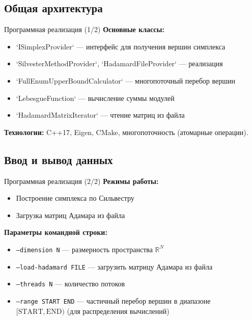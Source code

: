 \documentclass{beamer}
\begin{document}
\subsection{Общая архитектура} %
\begin{frame}{Программная реализация (1/2)}
    \textbf{Основные классы:}
    \begin{itemize}
        \item `ISimplexProvider` — интерфейс для получения вершин симплекса
        \item `SilvesterMethodProvider`, `HadamardFileProvider` — реализация
        \item `FullEnumUpperBoundCalculator` — многопоточный перебор вершин
        \item `LebesgueFunction` — вычисление суммы модулей
        \item `HadamardMatrixIterator` — чтение матриц из файла
    \end{itemize}
    \textbf{Технологии:} C++17, Eigen, CMake, многопоточность (атомарные операции).
\end{frame}

\subsection{Ввод и вывод данных}
\begin{frame}{Программная реализация (2/2)}
    \textbf{Режимы работы:}
    \begin{itemize}
        \item Построение симплекса по Сильвестру
        \item Загрузка матриц Адамара из файла
    \end{itemize}

    \textbf{Параметры командной строки:}
    \begin{itemize}
        \item \texttt{--dimension N} — размерность пространства $\mathbb{R}^N$
        \item \texttt{--load-hadamard FILE} — загрузить матрицу Адамара из файла
        \item \texttt{--threads N} — количество потоков
        \item \texttt{--range START END} — частичный перебор вершин в диапазоне $[\text{START}, \text{END})$ (для распределения вычислений)
    \end{itemize}
\end{frame}
\end{document}
